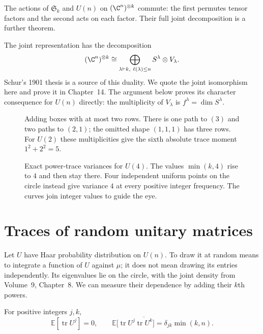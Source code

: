 The actions of $\mathfrak S_k$ and $U(n)$ on $(\C^n)^{\otimes k}$ commute: the first permutes tensor factors and the second acts on each factor. Their full joint decomposition is a further theorem.

\begin{remark}
The joint representation has the decomposition
\[
(\C^n)^{\otimes k}
\cong\bigoplus_{\lambda\vdash k,\ \ell(\lambda)\le n}S^\lambda\otimes V_\lambda.
\]
Schur's 1901 thesis is a source of this duality. We quote the joint isomorphism here and prove it in Chapter~14. The argument below proves its character consequence for $U(n)$ directly: the multiplicity of $V_\lambda$ is $f^\lambda=\dim S^\lambda$.
\end{remark}

\begin{figure}[ht]
\centering
{}
\caption{Adding boxes with at most two rows. There is one path to $(3)$ and two paths to $(2,1)$; the omitted shape $(1,1,1)$ has three rows. For $U(2)$ these multiplicities give the sixth absolute trace moment $1^2+2^2=5$.}
\label{fig:v10new-ch11-growth}
\end{figure}

\begin{figure}[ht]
\centering
{}
\caption{Exact power-trace variances for $U(4)$. The values $\min(k,4)$ rise to $4$ and then stay there. Four independent uniform points on the circle instead give variance $4$ at every positive integer frequency. The curves join integer values to guide the eye.}
\label{fig:v10new-ch11-variance}
\end{figure}

\section{Traces of random unitary matrices}

Let $U$ have Haar probability distribution on $U(n)$. To draw it at random means to integrate a function of $U$ against $\mu$; it does not mean drawing its entries independently. Its eigenvalues lie on the circle, with the joint density from Volume~9, Chapter~8. We can measure their dependence by adding their $k$th powers.

\begin{proposition}\label{prop:powertraces}
For positive integers $j,k$,
\[
\mathbb E[\operatorname{tr}U^j]=0,
\qquad
\mathbb E\bigl[\operatorname{tr}U^j\overline{\operatorname{tr}U^k}\bigr]
=\delta_{jk}\min(k,n).
\]
\end{proposition}

